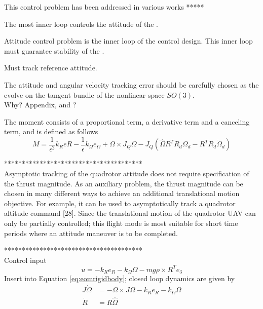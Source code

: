 This control problem has been addressed in various works *****

The most inner loop controls the attitude of the .
\begin{figure}[h!]
	\centering
	\caption{\label{fig:con.qrattloop}}
\end{figure}		

Attitude control problem is the inner loop of the control design. This inner loop must guarantee stability of the .

Must track reference attitude.

The attitude and angular velocity tracking error should be carefully chosen as the evolve on the tangent bundle of the nonlinear space $ SO(3) $. \cite{Lee2010}\\
Why? Appendix\cite{Lee2010}, and \cite{Bullo2005}?

The moment consists of a proportional term, a derivative term and a canceling term, and is defined as follows
\begin{equation}\label{eq:con.M}
M = \frac{1}{\epsilon^2}k_ReR-\frac{1}{\epsilon}k_\Omega e_\Omega+\Omega\times J_Q\Omega-J_Q(\hat{\Omega}R^TR_d\Omega_d-R^TR_d\dot{\Omega}_d)
\end{equation}

***************************************\\
Asymptotic tracking of the quadrotor attitude does not require specification of the thrust magnitude. As an auxiliary problem, the thrust magnitude can be chosen in many different ways to achieve an additional translational motion objective. For example, it can be used to asymptotically track a quadrotor altitude command [28]. Since the translational motion of the quadrotor UAV can only be partially controlled; this flight mode is most suitable for short time periods where an attitude maneuver is to be completed. \cite{Goodarzi2015b}

***************************************\\

Control input \cite{Lee2011}
\begin{equation}\label{eq:inputattitude}
u=-k_Re_R-k_\Omega\Omega-mg\rho\times R^Te_3
\end{equation}
Insert into Equation \ref{eq:eomrigidbody}; closed loop dynamics are given by
\begin{align}\label{eq:CLdynamics}
J\dot{\Omega} &= -\Omega\times J\Omega-k_Re_R-k_\Omega\Omega \\
\dot{R} &= R\hat{\Omega}
\end{align}

